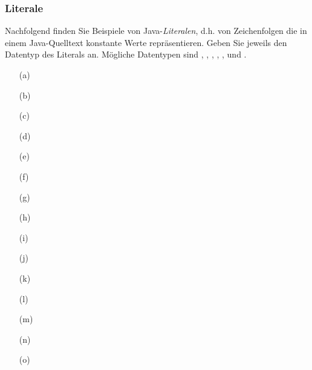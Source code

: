 \begin{frame}[fragile]%
 \frametitle{Literale}
\medskip


Nachfolgend finden Sie Beispiele von Java-\emph{Literalen}, d.h. von Zeichenfolgen die in einem Java-Quelltext konstante Werte repr\"asentieren.
Geben Sie jeweils den Datentyp des Literals an.
M\"ogliche Datentypen sind , , , , ,  und .

\begin{center}

\begin{minipage}{0.3\textwidth}
\begin{itemize}
\item[(a)] 
\item[(b)] 
\item[(c)] 
\item[(d)] 
\item[(e)] 
\end{itemize}
\end{minipage}

\begin{minipage}{0.3\textwidth}
\begin{itemize}
\item[(f)] 
\item[(g)] 
\item[(h)] 
\item[(i)] 
\item[(j)] 
\end{itemize}
\end{minipage}

\begin{minipage}{0.3\textwidth}
\begin{itemize}
\item[(k)] 
\item[(l)] 
\item[(m)] 
\item[(n)] 
\item[(o)] 
\end{itemize}
\end{minipage}

\end{center}


\end{frame}
